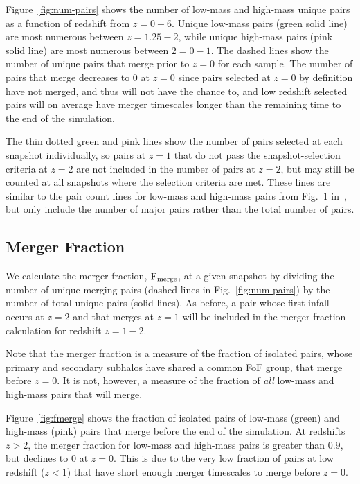 \documentclass[twocolumn,linenumbers]{aastex631}
\begin{document}
Figure~\ref{fig:num-pairs} shows the number of low-mass and high-mass unique pairs as a function of redshift from $z=0-6$. 
Unique low-mass pairs (green solid line) are most numerous between $z=1.25-2$, while unique high-mass pairs (pink solid line) are most numerous between $2=0-1$.
The dashed lines show the number of unique pairs that merge prior to $z=0$ for each sample. 
The number of pairs that merge decreases to 0 at $z=0$ since pairs selected at $z=0$ by definition have not merged, and thus will not have the chance to, and low redshift selected pairs will on average have merger timescales longer than the remaining time to the end of the simulation. 

The thin dotted green and pink lines show the number of pairs selected at each snapshot individually, so pairs at $z=1$ that do not pass the snapshot-selection criteria at $z=2$ are not included in the number of pairs at $z=2$, but may still be counted at all snapshots where the selection criteria are met. 
These lines are similar to the pair count lines for low-mass and high-mass pairs from Fig.~1 in~\cite{Chamberlain2024}, but only include the number of major pairs rather than the total number of pairs.

\subsection{Merger Fraction}
We calculate the merger fraction, $\rm F_{merge}$, at a given snapshot by dividing the number of unique merging pairs (dashed lines in Fig.~\ref{fig:num-pairs}) by the number of total unique pairs (solid lines). 
As before, a pair whose first infall occurs at $z=2$ and that merges at $z=1$ will be included in the merger fraction calculation for redshift $z=1-2$.

Note that the merger fraction is a measure of the fraction of isolated pairs, whose primary and secondary subhalos have shared a common FoF group, that merge before $z=0$. 
It is not, however, a measure of the fraction of \textit{all} low-mass and high-mass pairs that will merge. 

Figure~\ref{fig:fmerge} shows the fraction of isolated pairs of low-mass (green) and high-mass (pink) pairs that merge before the end of the simulation. 
At redshifts $z>2$, the merger fraction for low-mass and high-mass pairs is greater than $0.9$, but declines to $0$ at $z=0$. 
This is due to the very low fraction of pairs at low redshift ($z<1$) that have short enough merger timescales to merge before $z=0$.
\end{document}
